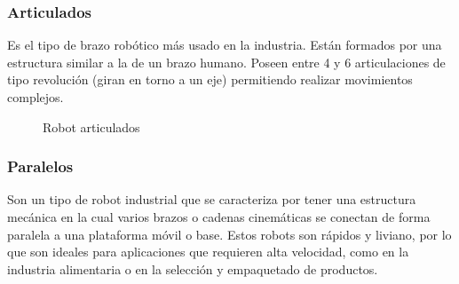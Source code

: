 \subsubsection{Articulados}
Es el tipo de brazo robótico más usado en la industria. Están formados por una estructura similar a la de un brazo humano. Poseen entre 4 y 6 articulaciones de tipo 
revolución (giran en torno a un eje) permitiendo realizar movimientos complejos. 
\begin{figure} [h!]
  \centering    
  \hspace{1.5cm}
  \caption{Robot articulados}
\end{figure}

\subsubsection{Paralelos}
Son un tipo de robot industrial que se caracteriza por tener una estructura mecánica en la cual varios brazos o cadenas cinemáticas se conectan de forma paralela a una plataforma móvil o 
base. Estos robots son rápidos y liviano, por lo que son ideales para aplicaciones que requieren alta velocidad, como en la industria alimentaria o en la selección y
empaquetado de productos.

